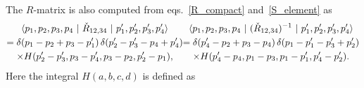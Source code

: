 \documentclass[12pt]{article}
\numberwithin{equation}{section}
\begin{document}
The $R$-matrix  is also computed from eqs.~\eqref{R_compact}
and~\eqref{S_element}
as~\cite{Hikam00a}
\begin{subequations}
  \label{R_element}
  \begin{multline}
    \langle p_1, p_2, p_3 , p_4 \ | \  \Check{R}_{1 2, 3 4}  \ | \
    p_1^\prime , p_2^\prime, p_3^\prime, p_4^\prime \rangle
    \\
    =
    \delta(p_1 -p_2+p_3- p_1^\prime) \,
    \delta(p_2^\prime - p_3^\prime - p_4  + p_4^\prime) 
    \\
    \times
    H(p_2^\prime - p_3^\prime , p_3 - p_4^\prime ,
    p_3 - p_2, p_2^\prime  - p_1)  ,
%
  \end{multline}
%
  \begin{multline}
    \langle p_1, p_2, p_3 , p_4 \  | \ ( \Check{R}_{1 2, 3 4} )^{-1}
    \ | \
    p_1^\prime , p_2^\prime, p_3^\prime, p_4^\prime \rangle
    \\
    =
    \delta(p_4^\prime  -p_2+p_3- p_4) \,
    \delta(p_1 - p_1^\prime - p_3^\prime  + p_2^\prime) 
    \\
    \times
    H(p_4^\prime - p_4, p_1 - p_3 ,
    p_1 - p_1^\prime , p_4^\prime - p_2^\prime)  .
%
  \end{multline}
\end{subequations}
Here the integral $H(a,b,c,d)$ is defined as
\end{document}
